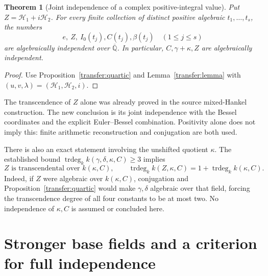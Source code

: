 \documentclass[11pt]{article}
\newtheorem{theorem}{Theorem}[section]
\theoremstyle{definition}
\theoremstyle{remark}
\begin{document}
\begin{theorem}[Joint independence of a complex positive-integral value]
\label{transfer:hankel}
Put $Z=\mathcal H_1+i\mathcal H_2$. For every finite collection of distinct positive algebraic
$t_1,\ldots,t_s$, the numbers
\[
 e,\ Z,\ I_0(t_j),C(t_j),\beta(t_j)\quad(1\le j\le s)
\]
are algebraically independent over $\overline{\mathbb Q}$. In particular,
$C,\gamma+\kappa,Z$ are algebraically independent.
\end{theorem}
\begin{proof}
Use Proposition~\ref{transfer:quartic} and Lemma~\ref{transfer:lemma} with
$(u,v,\lambda)=(\mathcal H_1,\mathcal H_2,i)$.
\end{proof}

The transcendence of $Z$ alone was already proved in the source mixed-Hankel
construction. The new conclusion is its joint independence with the Bessel
coordinates and the explicit Euler--Bessel combination. Positivity alone
does not imply this: finite arithmetic reconstruction and conjugation are
both used.

There is also an exact statement involving the unshifted quotient $\kappa$.
The established bound
$\operatorname{trdeg}_k k(\gamma,\delta,\kappa,C)\ge3$ implies
\begin{equation}\label{transfer:unshifted}
 Z\text{ is transcendental over }k(\kappa,C),\qquad
 \operatorname{trdeg}_k k(Z,\kappa,C)
 =1+\operatorname{trdeg}_k k(\kappa,C).
\end{equation}
Indeed, if $Z$ were algebraic over $k(\kappa,C)$, conjugation and
Proposition~\ref{transfer:quartic} would make $\gamma,\delta$ algebraic over
that field, forcing the transcendence degree of all four constants to be at
most two. No independence of $\kappa,C$ is assumed or concluded here.



\section{Stronger base fields and a criterion for full independence}
\end{document}
